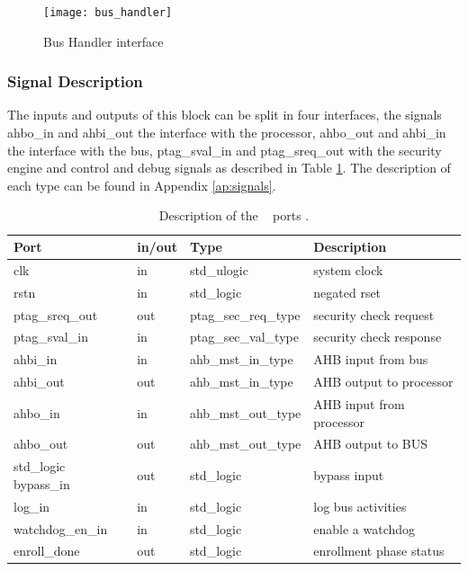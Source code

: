 \begin{figure}[!ht]
    \centering
    \texttt{[image: bus\_handler]}
    \caption{Bus Handler  interface }
    \label{fig:bhbb}
\end{figure}


\subsubsection{Signal Description}

The inputs and outputs of this block can be split in four interfaces,
the signals  ahbo\_in and ahbi\_out the interface with the processor,  ahbo\_out  and ahbi\_in
the interface with the bus, ptag\_sval\_in and ptag\_sreq\_out with the security engine and control and debug signals as described in Table \ref{table:shports}.
 The description of each type can be found in Appendix \ref{ap:signals}.

\begin{table}[H]
\begin{tabular}{l l l l}
\textbf{Port}   & \textbf{in/out} & \textbf{Type}        & \textbf{Description} 	\\ \hline \hline
clk             & in              & std\_ulogic          & system clock         	\\ \hline
rstn            & in              & std\_logic           & negated rset         	\\ \hline
ptag\_sreq\_out & out             & ptag\_sec\_req\_type & security check request    	\\ \hline
ptag\_sval\_in  & in              & ptag\_sec\_val\_type & security check response  	\\ \hline
ahbi\_in        & in              & ahb\_mst\_in\_type   & AHB input from bus      	\\ \hline
ahbi\_out       & out             & ahb\_mst\_in\_type   & AHB output to processor      \\ \hline
ahbo\_in        & in              & ahb\_mst\_out\_type  & AHB input from processor    \\ \hline
ahbo\_out       & out             & ahb\_mst\_out\_type  & AHB output to BUS            \\ \hline
std\_logic         
bypass\_in      & out             & std\_logic           & bypass input         	\\ \hline
log\_in         & in              & std\_logic           & log bus activities       \\ \hline
watchdog\_en\_in  & in            & std\_logic           & enable a watchdog             \\ \hline
enroll\_done     & out             & std\_logic          & enrollment phase status            \\ \hline

\end{tabular}
 \caption{Description of the \handler~ ports .}
 \label{table:shports}

\end{table}

